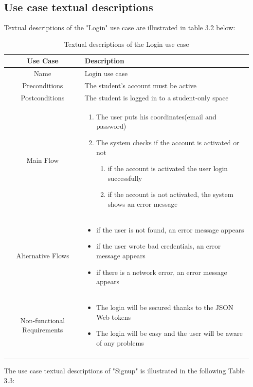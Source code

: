 \subsection{Use case textual descriptions}
Textual descriptions of the "Login" use case are illustrated in table 3.2 below:
\begin{longtable}{|c|p{10cm}|}
\hline
Use Case & Description \\\hline
Name & Login use case \\\hline
Preconditions & The student's account must be active \\\hline
Postconditions & The student is logged in to a student-only space \\ \hline
Main Flow & \begin{enumerate}
    \item The user puts his coordinates(email and password) 
    \item The system checks if the account is activated or not
    \begin{enumerate}
        \item if the account is activated the user login successfully 
        \item if the account is not activated, the system shows an error message
    \end{enumerate}    
\end{enumerate}
\\\hline
Alternative Flows & \begin{itemize}
    \item if the user is not found, an error message appears
    \item if the user wrote bad credentials, an error message appears
    \item if there is a network error, an error message appears
\end{itemize}
\\\hline
Non-functional Requirements & \begin{itemize}
    \item The login will be secured thanks to the JSON Web tokens
    \item The login will be easy and the user will be aware of any problems
\end{itemize}
\\\hline
\caption{Textual descriptions of the Login use case}
\label{Tab: Textual descriptions of the Login use case}
\end{longtable}

The use case textual descriptions of "Signup" is illustrated in the
following Table 3.3:

